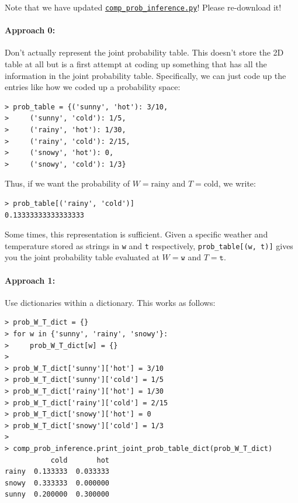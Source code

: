 \documentclass[6008notes.tex]{subfiles}
\begin{document}
Note that we have updated \href{https://d37djvu3ytnwxt.cloudfront.net/assets/courseware/v1/710ba23b569da54c14fc614315ced6a1/asset-v1:MITx+6.008.1x+3T2016+type@asset+block/comp_prob_inference.py}{\texttt{comp\_prob\_inference.py}}! Please re-download it!

\paragraph{Approach 0:} Don't actually represent the joint probability table. This doesn't store the 2D table at all but is a first attempt at coding up something that has all the information in the joint probability table. Specifically, we can just code up the entries like how we coded up a probability space:

\begin{lstlisting}
> prob_table = {('sunny', 'hot'): 3/10,
>     ('sunny', 'cold'): 1/5,
>     ('rainy', 'hot'): 1/30,
>     ('rainy', 'cold'): 2/15,
>     ('snowy', 'hot'): 0,
>     ('snowy', 'cold'): 1/3}
\end{lstlisting}

Thus, if we want the probability of $W=\text {rainy}$ and $T=\text {cold}$, we write:

\begin{lstlisting}
> prob_table[('rainy', 'cold')]
0.13333333333333333
\end{lstlisting}

Some times, this representation is sufficient. Given a specific weather and temperature stored as strings in \texttt{w} and \texttt{t} respectively, \lstinline{prob_table[(w, t)]} gives you the joint probability table evaluated at $W = \texttt{w}$ and $T = \texttt{t}$.

\paragraph{Approach 1:} Use dictionaries within a dictionary. This works as follows:

\begin{lstlisting}
> prob_W_T_dict = {}
> for w in {'sunny', 'rainy', 'snowy'}:
>     prob_W_T_dict[w] = {}
>
> prob_W_T_dict['sunny']['hot'] = 3/10
> prob_W_T_dict['sunny']['cold'] = 1/5
> prob_W_T_dict['rainy']['hot'] = 1/30
> prob_W_T_dict['rainy']['cold'] = 2/15
> prob_W_T_dict['snowy']['hot'] = 0
> prob_W_T_dict['snowy']['cold'] = 1/3
>
> comp_prob_inference.print_joint_prob_table_dict(prob_W_T_dict)
           cold       hot
rainy  0.133333  0.033333
snowy  0.333333  0.000000
sunny  0.200000  0.300000
\end{lstlisting}
\end{document}
